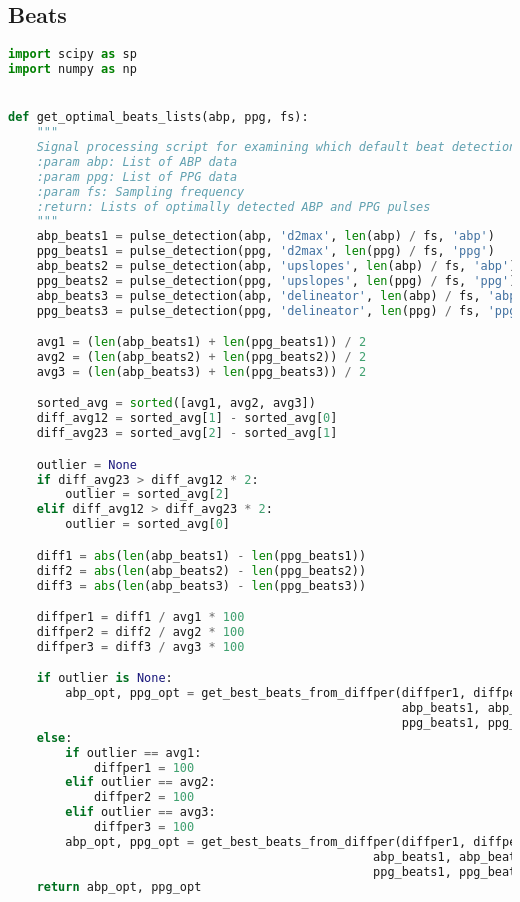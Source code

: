 \subsection{Beats}
\label{subsec:code_beats}

\begin{lstlisting}[language=Python,label={lst:beats.py}, basicstyle=\scriptsize]
import scipy as sp
import numpy as np


def get_optimal_beats_lists(abp, ppg, fs):
    """
    Signal processing script for examining which default beat detection algorithm is the most efficient
    :param abp: List of ABP data
    :param ppg: List of PPG data
    :param fs: Sampling frequency
    :return: Lists of optimally detected ABP and PPG pulses
    """
    abp_beats1 = pulse_detection(abp, 'd2max', len(abp) / fs, 'abp')
    ppg_beats1 = pulse_detection(ppg, 'd2max', len(ppg) / fs, 'ppg')
    abp_beats2 = pulse_detection(abp, 'upslopes', len(abp) / fs, 'abp')
    ppg_beats2 = pulse_detection(ppg, 'upslopes', len(ppg) / fs, 'ppg')
    abp_beats3 = pulse_detection(abp, 'delineator', len(abp) / fs, 'abp')
    ppg_beats3 = pulse_detection(ppg, 'delineator', len(ppg) / fs, 'ppg')

    avg1 = (len(abp_beats1) + len(ppg_beats1)) / 2
    avg2 = (len(abp_beats2) + len(ppg_beats2)) / 2
    avg3 = (len(abp_beats3) + len(ppg_beats3)) / 2

    sorted_avg = sorted([avg1, avg2, avg3])
    diff_avg12 = sorted_avg[1] - sorted_avg[0]
    diff_avg23 = sorted_avg[2] - sorted_avg[1]

    outlier = None
    if diff_avg23 > diff_avg12 * 2:
        outlier = sorted_avg[2]
    elif diff_avg12 > diff_avg23 * 2:
        outlier = sorted_avg[0]

    diff1 = abs(len(abp_beats1) - len(ppg_beats1))
    diff2 = abs(len(abp_beats2) - len(ppg_beats2))
    diff3 = abs(len(abp_beats3) - len(ppg_beats3))

    diffper1 = diff1 / avg1 * 100
    diffper2 = diff2 / avg2 * 100
    diffper3 = diff3 / avg3 * 100

    if outlier is None:
        abp_opt, ppg_opt = get_best_beats_from_diffper(diffper1, diffper2, diffper3,
                                                       abp_beats1, abp_beats2, abp_beats3,
                                                       ppg_beats1, ppg_beats2, ppg_beats3)
    else:
        if outlier == avg1:
            diffper1 = 100
        elif outlier == avg2:
            diffper2 = 100
        elif outlier == avg3:
            diffper3 = 100
        abp_opt, ppg_opt = get_best_beats_from_diffper(diffper1, diffper2, diffper3,
                                                   abp_beats1, abp_beats2, abp_beats3,
                                                   ppg_beats1, ppg_beats2, ppg_beats3)
    return abp_opt, ppg_opt



\end{lstlisting}

